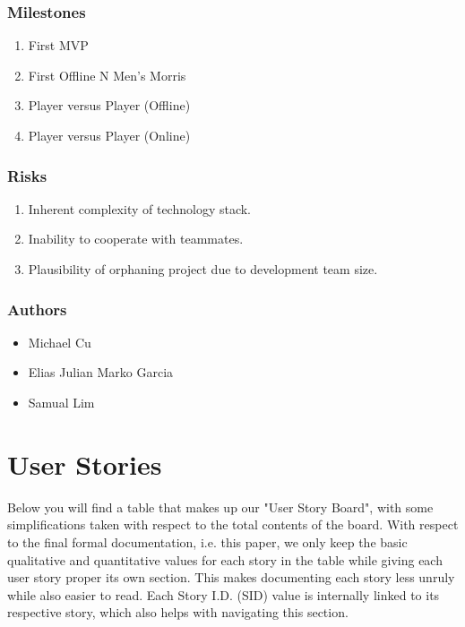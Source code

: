 \documentclass[11pt]{article}
\begin{document}
\subsubsection*{Milestones}
\label{sec:orgb33e006}
\begin{enumerate}
\item First MVP
\item First Offline N Men's Morris
\item Player versus Player (Offline)
\item Player versus Player (Online)
\end{enumerate}
\subsubsection*{Risks}
\label{sec:orgab115d7}
\begin{enumerate}
\item Inherent complexity of technology stack.
\item Inability to cooperate with teammates.
\item Plausibility of orphaning project due to development team size.
\end{enumerate}
\subsubsection*{Authors}
\label{sec:org4189d41}
\begin{itemize}
\item Michael Cu
\item Elias Julian Marko Garcia
\item Samual Lim
\end{itemize}
\section{User Stories}
\label{sec:org97af3de}
Below you will find a table that makes up our "User Story Board", with some simplifications taken
with respect to the total contents of the board. With respect to the final formal documentation,
i.e. this paper, we only keep the basic qualitative and quantitative values for each story in the
table while giving each user story proper its own section. This makes documenting each story
less unruly while also easier to read. Each Story I.D. (SID) value is internally linked to its
respective story, which also helps with navigating this section.
\end{document}
